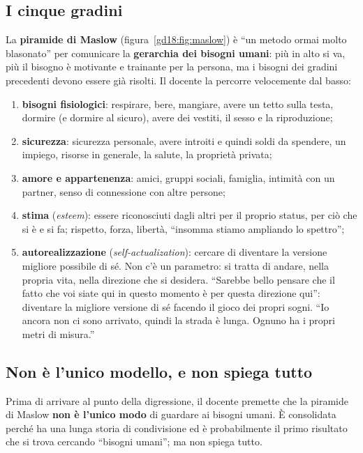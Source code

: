 \subsection{I cinque gradini}

La \textbf{piramide di Maslow} (figura~\ref{gd18:fig:maslow}) è ``un metodo ormai molto
blasonato'' per comunicare la \textbf{gerarchia dei bisogni umani}: più in alto si
va, più il bisogno è motivante e trainante per la persona, ma i bisogni dei gradini
precedenti devono essere già risolti. Il docente la percorre velocemente dal basso:
\begin{enumerate}
  \item \textbf{bisogni fisiologici}: respirare, bere, mangiare, avere un tetto sulla
        testa, dormire (e dormire al sicuro), avere dei vestiti, il sesso e la
        riproduzione;
  \item \textbf{sicurezza}: sicurezza personale, avere introiti e quindi soldi da
        spendere, un impiego, risorse in generale, la salute, la proprietà privata;
  \item \textbf{amore e appartenenza}: amici, gruppi sociali, famiglia, intimità con
        un partner, senso di connessione con altre persone;
  \item \textbf{stima} (\emph{esteem}): essere riconosciuti dagli altri per il proprio
        status, per ciò che si è e si fa; rispetto, forza, libertà, ``insomma stiamo
        ampliando lo spettro'';
  \item \textbf{autorealizzazione} (\emph{self-actualization}): cercare di diventare
        la versione migliore possibile di sé. Non c'è un parametro: si tratta di
        andare, nella propria vita, nella direzione che si desidera. ``Sarebbe bello
        pensare che il fatto che voi siate qui in questo momento è per questa
        direzione qui'': diventare la migliore versione di sé facendo il gioco dei
        propri sogni. ``Io ancora non ci sono arrivato, quindi la strada è lunga.
        Ognuno ha i propri metri di misura.''
\end{enumerate}

\subsection{Non è l'unico modello, e non spiega tutto}

Prima di arrivare al punto della digressione, il docente premette che la piramide di
Maslow \textbf{non è l'unico modo} di guardare ai bisogni umani. È consolidata perché
ha una lunga storia di condivisione ed è probabilmente il primo risultato che si
trova cercando ``bisogni umani''; ma non spiega tutto.

